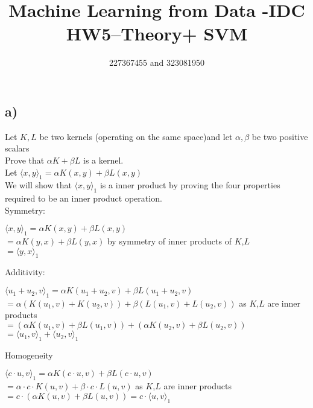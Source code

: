 \documentclass[12pt]{article}
\title{Machine Learning from Data -IDC\\HW5–Theory+ SVM}
\author{227367455 and 323081950}
\newcommand\tab[1][1cm]{\hspace*{#1}}
\begin{document}
\maketitle

\section*{}

\subsection*{a)}

Let $K,L$ be two kernels (operating on the same space)and let $ \alpha, \beta $ be two positive scalars \\
\tab Prove that $\alpha K + \beta L $ is a kernel.\\

Let $\langle x,y \rangle_1 = \alpha K(x,y) + \beta L(x,y) $ \\
We will show that $ \langle x,y \rangle_1 $ is a inner product by proving the four properties required to be an inner product operation. \\

\tab Symmetry:

$ \langle x,y \rangle_1 = \alpha K(x,y) + \beta L(x,y) $ \\
$ = \alpha K(y,x) + \beta L(y,x) $ by symmetry of inner products of $K$,$L$ \\
$ = \langle y,x \rangle_1 $
		
\tab Additivity:

$ \langle u_1 + u_2, v \rangle_1 = \alpha K(u_1 + u_2, v) + \beta L(u_1 + u_2, v) $ \\
$ = \alpha (K(u_1, v) + K(u_2, v)) + \beta (L(u_1, v) + L(u_2, v)) $ as $K$,$L$ are inner products \\
$ = (\alpha K(u_1, v) + \beta L(u_1, v)) + (\alpha K(u_2, v) + \beta L(u_2, v)) $ \\
$ = \langle u_1, v \rangle_1 + \langle u_2, v \rangle_1 $

\tab Homogeneity

$ \langle c\cdot u, v \rangle_1 = \alpha K(c\cdot u, v) + \beta L(c\cdot u, v) $ \\
$ = \alpha \cdot c \cdot K(u, v) + \beta \cdot c \cdot L(u, v) $ as $K$,$L$ are inner products \\
$ = c\cdot (\alpha K(u, v) + \beta L(u, v))  = c \cdot \langle u, v \rangle_1 $
\end{document}
